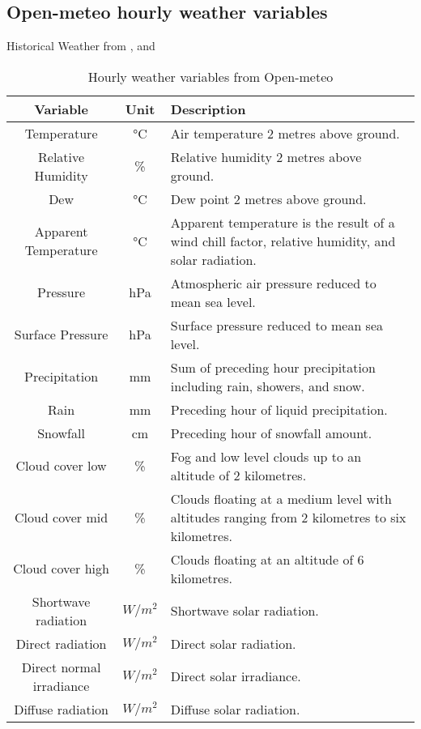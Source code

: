 \subsection{Open-meteo hourly weather variables \cite{Zippenfenig_Open-Meteo}}
Historical Weather \cite{Zippenfenig_Open-Meteo} from \cite{Hersbach_ERA5}, \cite{Munoz_ERA5_LAND} and \cite{Schimanke_CERRA}
\label{open_meteo}
\begin{table}[h!]
\caption{Hourly weather variables from Open-meteo}
\centering
\small
\begin{tabular}{|c|c|p{10cm}|} %
\hline
\textbf{Variable} & \textbf{Unit} & \textbf{Description}\\
\hline
Temperature & °C & Air temperature 2 metres above ground. \\
\hline
Relative Humidity & \% & Relative humidity 2 metres above ground. \\
\hline
Dew & °C & Dew point 2 metres above ground. \\
\hline
Apparent Temperature & °C & Apparent temperature is the 
result of a wind chill factor, relative humidity, and solar radiation. \\
\hline
Pressure & hPa & Atmospheric air pressure reduced to mean sea level. \\
\hline
Surface Pressure & hPa & Surface pressure reduced to mean sea level. \\
\hline
Precipitation & mm & Sum of preceding hour precipitation including rain, showers, and snow. \\
\hline
Rain & mm & Preceding hour of liquid precipitation. \\
\hline
Snowfall & cm & Preceding hour of snowfall amount. \\
\hline
Cloud cover low & \% & Fog and low level clouds up to an altitude of 2 kilometres. \\
\hline
Cloud cover mid & \% & Clouds floating at a medium level with altitudes ranging from 2 kilometres to six kilometres. \\
\hline
Cloud cover high & \% & Clouds floating at an altitude of 6 kilometres. \\
\hline
Shortwave radiation & $W/m^2$ & Shortwave solar radiation.  \\
\hline
Direct radiation & $W/m^2$ & Direct solar radiation. \\
\hline
Direct normal irradiance & $W/m^2$ & Direct solar irradiance.  \\
\hline
Diffuse radiation & $W/m^2$ & Diffuse solar radiation.  \\

\end{tabular}
\end{table}
